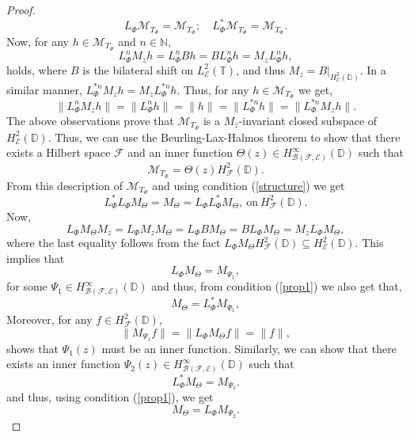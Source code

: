 \documentclass[12pt]{amsart}
\numberwithin{equation}{section}
\theoremstyle{definition}
\newcommand{\Nat}{\mathbb{N}}
\newcommand{\D}{\mathbb{D}}
\newcommand{\T}{\mathbb{T}}
\newcommand{\1}{{\mbox{\bf 1}}}
\newcommand{\clb}{\mathcal{B}}
\newcommand{\cle}{\mathcal{E}}
\newcommand{\clf}{\mathcal{F}}
\newcommand{\clm}{\mathcal{M}}
\begin{document}
\begin{proof}
\begin{equation}\label{cnu1}
L_{\Phi} \clm_{T_{\Phi}} = \clm_{T_{\Phi}}; \quad L_{\Phi}^* \clm_{T_{\Phi}} = \clm_{T_{\Phi}}.
\end{equation}
Now, for any $h \in \clm_{T_{\Phi}}$ and $n \in \Nat$,
\[
L_{\Phi}^n M_z h = L_{\Phi}^n B h = B L_{\Phi}^n h = M_z L_{\Phi}^n h,
\]
holds, where $B$ is the bilateral shift on $L_{\cle}^2(\T)$, and thus $M_z = B|_{H_{\cle}^2(\D)}$. In a similar manner, $L_{\Phi}^{*n} M_z h = M_z L_{\Phi}^{*n} h$. Thus, for any $h \in \clm_{T_{\Phi}}$ we get,
\[
\| L_{\Phi}^n M_z h \| = \|L_{\Phi}^n h\| = \|h\| =  \|L_{\Phi}^{*n} h\| = \| L_{\Phi}^{*n} M_z h \|.
\]
The above observations prove that $\clm_{T_{\Phi}}$ is a $M_z$-invariant closed subspace of $H_{\cle}^2(\D)$. Thus, we can use the Beurling-Lax-Halmos theorem to show that there exists a Hilbert space $\clf$ and an inner function $\Theta(z) \in H_{\clb(\clf, \cle)}^{\infty}(\D)$ such that
\[
\clm_{T_{\Phi}} = \Theta(z) H_{\clf}^2(\D).
\]
From this description of $\clm_{T_{\Phi}}$ and using condition (\ref{structure}) we get 
\begin{equation}\label{prop1}
L_{\Phi}^* L_{\Phi} M_{\Theta} = M_{\Theta} = L_{\Phi} L_{\Phi}^* M_{\Theta},~\text{on}~H_{\clf}^2(\D).
\end{equation}
Now, 
\[
L_{\Phi} M_{\Theta} M_z = L_{\Phi} M_z M_{\Theta} = L_{\Phi} B M_{\Theta} = B L_{\Phi} M_{\Theta}  = M_z L_{\Phi} M_{\Theta},
\]
where the last equality follows from the fact $ L_{\Phi} M_{\Theta} H_{\clf}^2(\D) \subseteq H_{\cle}^2(\D)$. This implies that 
\begin{equation}\label{condn1}
L_{\Phi} M_{\Theta}  = M_{\Psi_1},
\end{equation}
for some $\Psi_1 \in H_{\clb(\clf,\cle)}^{\infty}(\D)$ and thus, from condition (\ref{prop1}) we also get that,
\begin{equation}\label{condn4}
 M_{\Theta}  = L_{\Phi}^* M_{\Psi_1},
\end{equation}
Moreover, for any $f \in H_{\clf}^2(\D)$,
\[
\|M_{\Psi_1} f\| = \|L_{\Phi} M_{\Theta} f\| = \|f\|,
\]
shows that $\Psi_1(z)$ must be an inner function. Similarly, we can show that there exists an inner function $\Psi_2(z) \in H_{\clb(\clf,\cle)}^{\infty}(\D)$ such that
\begin{equation}\label{condn2}
L_{\Phi}^* M_{\Theta} = M_{\Psi_2}.
\end{equation}
and thus, using condition (\ref{prop1}), we get
\begin{equation}\label{ancondn1}
 M_{\Theta} = L_{\Phi} M_{\Psi_2}.

\end{equation}
\end{proof}
\end{document}
